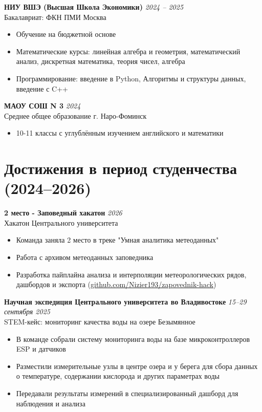 \documentclass[11pt,a4paper]{article}
\newcommand{\hlblue}[1]{\textcolor{pastelblue}{#1}}
\newcommand{\hlteal}[1]{\textcolor{pastelteal}{#1}}
\newcommand{\cventry}[5]{
  \par\noindent
  \begin{minipage}{\textwidth}
  \textbf{\color{primarycolor}#1} \hfill {\color{secondarycolor}\textit{#2}}\\
  {\color{secondarycolor}#3} \hfill {\color{secondarycolor}#4}
  \vspace{2pt}

  #5
  \end{minipage}
  \vspace{4pt}
}
\newcommand{\achievement}[4]{
  \par\noindent
  \begin{minipage}{\textwidth}
  \textbf{\color{primarycolor}#1} \hfill {\color{secondarycolor}\textit{#2}}\\
  {\color{secondarycolor}#3}
  \vspace{2pt}

  #4
  \end{minipage}
  \vspace{4pt}
}
\begin{document}
\cventry
  {НИУ ВШЭ (Высшая Школа Экономики)}
  {2024 -- 2025}
  {Бакалавриат: ФКН ПМИ}
  {Москва}
  {
    \begin{itemize}
      \item Обучение на бюджетной основе
      \item Математические курсы: линейная алгебра и геометрия, математический анализ, дискретная математика, теория чисел, алгебра
      \item Программирование: введение в Python, Алгоритмы и структуры данных, введение с C++
    \end{itemize}
  }

\cventry
  {МАОУ СОШ N 3}
  {2024}
  {Среднее общее образование}
  {г. Наро-Фоминск}
  {
    \begin{itemize}
      \item 10-11 классы с углублённым изучением английского и математики
    \end{itemize}
  }

\section{Достижения в период студенчества (2024--2026)}

\achievement
  {2 место  -  Заповедный хакатон}
  {2026}
  {Хакатон Центрального университета}
  {
    \begin{itemize}
      \item Команда заняла \hlblue{2 место} в треке \hlteal{"Умная аналитика метеоданных"}
      \item Работа с архивом метеоданных заповедника
      \item Разработка пайплайна анализа и интерполяции метеорологических рядов, дашбордов и экспорта (\href{https://github.com/Nizier193/zapovednik-hack}{github.com/Nizier193/zapovednik-hack})
    \end{itemize}
  }

\achievement
  {Научная экспедиция Центрального университета во Владивостоке}
  {15--29 сентября 2025}
  {STEM-кейс: мониторинг качества воды на озере Безымянное}
  {
    \begin{itemize}
      \item В команде собрали систему мониторинга воды на базе микроконтроллеров ESP и датчиков
      \item Разместили измерительные узлы в центре озера и у берега для сбора данных о температуре, содержании кислорода и других параметрах воды
      \item Передавали результаты измерений в специализированный дашборд для наблюдения и анализа
    \end{itemize}
  }
\end{document}

